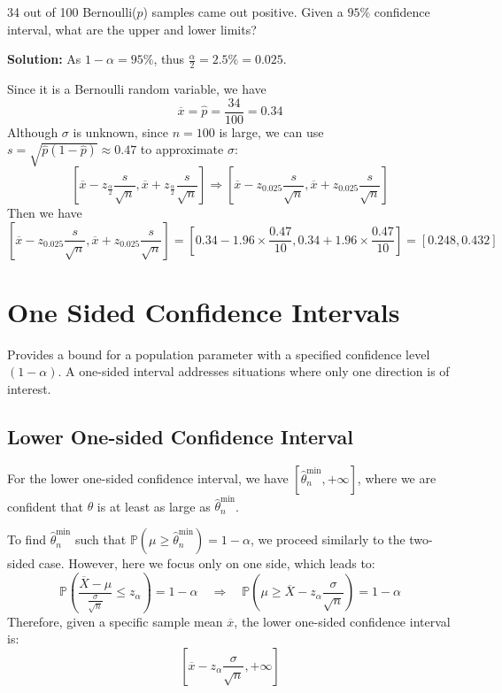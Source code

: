 \begin{eg}
  34 out of 100 Bernoulli(\(p\)) samples came out positive. Given a \(95\%\) confidence interval, what are the upper and lower limits?

  \textbf{Solution:}  
  As \(1 - \alpha = 95\%\), thus \(\frac{\alpha}{2} = 2.5\% = 0.025\).  

  Since it is a Bernoulli random variable, we have  
  \[
    \overline{x} = \hat{p} = \frac{34}{100} = 0.34
  \]  
  Although \(\sigma\) is unknown, since \(n = 100\) is large, we can use \(s = \sqrt{\hat{p}(1 - \hat{p})} \approx 0.47\) to approximate \(\sigma\):  
  \[
    \left[\overline{x} - z_{\frac{\alpha}{2}} \frac{s}{\sqrt{n}}, \overline{x} + z_{\frac{\alpha}{2}} \frac{s}{\sqrt{n}}\right] \Longrightarrow  
    \left[\overline{x} - z_{0.025} \frac{s}{\sqrt{n}}, \overline{x} + z_{0.025} \frac{s}{\sqrt{n}}\right]
  \]  
  Then we have  
  \[
    \left[\overline{x} - z_{0.025} \frac{s}{\sqrt{n}}, \overline{x} + z_{0.025} \frac{s}{\sqrt{n}}\right] = \left[0.34 - 1.96 \times \frac{0.47}{10}, 0.34 + 1.96 \times \frac{0.47}{10}\right] = [0.248, 0.432]
  \]  
\end{eg}

\section{One Sided Confidence Intervals}
Provides a bound for a population parameter with a specified confidence level \((1 - \alpha)\). A one-sided interval addresses situations where only one direction is of interest.

\subsection{Lower One-sided Confidence Interval}
For the lower one-sided confidence interval, we have \([\hat{\theta}_n^{\min}, +\infty]\), where we are confident that \(\theta\) is at least as large as \(\hat{\theta}_n^{\min}\). 

To find \(\hat{\theta}_n^{\min}\) such that \(\mathbb{P}(\mu \geq \hat{\theta}_n^{\min}) = 1 - \alpha\), we proceed similarly to the two-sided case. However, here we focus only on one side, which leads to:
\[
  \mathbb{P}\left(\frac{\overline{X} - \mu}{\frac{\sigma}{\sqrt{n}}} \leq z_{\alpha}\right) = 1 - \alpha \quad \Longrightarrow \quad
  \mathbb{P}\left(\mu \geq \overline{X} - z_{\alpha} \frac{\sigma}{\sqrt{n}}\right) = 1 - \alpha
\]
Therefore, given a specific sample mean \(\overline{x}\), the lower one-sided confidence interval is:
\[
    \left[\overline{x} - z_{\alpha} \frac{\sigma}{\sqrt{n}}, +\infty\right]
\]

